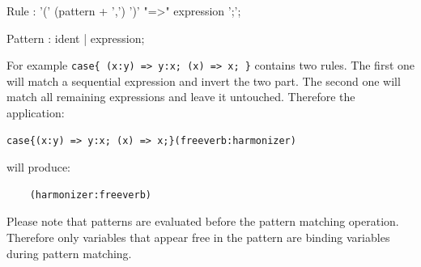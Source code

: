 \begin{rail}
Rule : '(' (pattern + ',') ')' "=>" expression ';';
\end{rail}

\begin{rail}
Pattern : ident | expression;
\end{rail}


For example \lstinline'case{ (x:y) => y:x; (x) => x; }' contains two rules. The first one will match a sequential expression and invert the two part. The second one will match all remaining expressions and leave it untouched. Therefore the application:

\begin{lstlisting}
case{(x:y) => y:x; (x) => x;}(freeverb:harmonizer)
\end{lstlisting}

will produce:

\begin{lstlisting}
	(harmonizer:freeverb)
\end{lstlisting}

Please note that patterns are evaluated before the pattern matching operation. Therefore only variables that appear free in the pattern are binding variables during pattern matching. 


